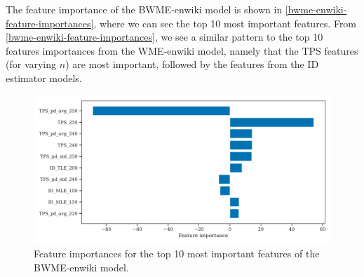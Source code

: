 The feature importance of the BWME-enwiki model is shown in \cref{bwme-enwiki-feature-importances}, where we can see the top 10 most important features. From \cref{bwme-enwiki-feature-importances}, we see a similar pattern to the top 10 features importances from the WME-enwiki model, namely that the TPS features (for varying $n$) are most important, followed by the features from the ID estimator models.
\begin{figure}[H]
    \centering
    \includegraphics[width=\textwidth]{thesis/figures/bwme-enwiki-top-10-feature-importances.pdf}
    \caption{Feature importances for the top 10 most important features of the BWME-enwiki model.}
    \label{fig:bwme-enwiki-feature-importances}
\end{figure}

